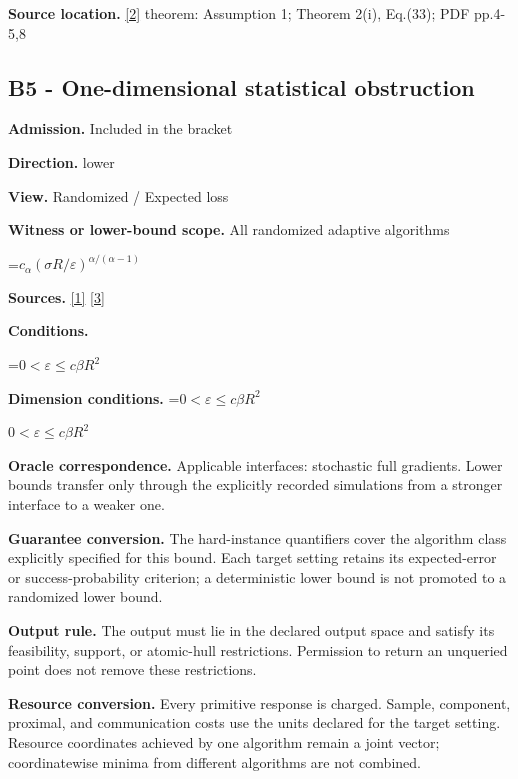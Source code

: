 \documentclass[10pt,a4paper]{article}
\newcommand{\AtlasMath}[1]{\par\begingroup\centering\setbox0=\hbox{$\displaystyle #1$}\ifdim\wd0>1.4\linewidth\typeout{ATLAS WIDE FORMULA: \the\wd0}\fi\ifdim\wd0>\linewidth\resizebox{\linewidth}{!}{\box0}\else\box0\fi\par\endgroup}
\newcommand{\AtlasInlineMath}[1]{\begingroup\setbox0=\hbox{$#1$}\ifdim\wd0>.4\linewidth\endgroup\AtlasMath{#1}\else\endgroup$#1$\fi}
\begin{document}
\textbf{Source location.} \href{https://arxiv.org/pdf/2510.11676}{[2]} theorem: Assumption 1; Theorem 2(i), Eq.(33); PDF pp.4-5,8



\subsection{B5 - One-dimensional statistical obstruction}


\textbf{Admission.} Included in the bracket



\textbf{Direction.} lower



\textbf{View.} Randomized / Expected loss



\textbf{Witness or lower-bound scope.} All randomized adaptive algorithms



\AtlasMath{c_\alpha (\sigma R/\varepsilon)^{\alpha/(\alpha-1)}}


\textbf{Sources.} \href{https://arxiv.org/pdf/2609.10874}{[1]} \href{https://proceedings.mlr.press/v202/sadiev23a/sadiev23a.pdf}{[3]}



\textbf{Conditions.}
\AtlasMath{0<\varepsilon\le c\beta R^2}




\textbf{Dimension conditions.} \AtlasInlineMath{0<\varepsilon\le c\beta R^2}



\textbf{Oracle correspondence.} Applicable interfaces: stochastic full gradients. Lower bounds transfer only through the explicitly recorded simulations from a stronger interface to a weaker one.



\textbf{Guarantee conversion.} The hard-instance quantifiers cover the algorithm class explicitly specified for this bound. Each target setting retains its expected-error or success-probability criterion; a deterministic lower bound is not promoted to a randomized lower bound.



\textbf{Output rule.} The output must lie in the declared output space and satisfy its feasibility, support, or atomic-hull restrictions. Permission to return an unqueried point does not remove these restrictions.



\textbf{Resource conversion.} Every primitive response is charged. Sample, component, proximal, and communication costs use the units declared for the target setting. Resource coordinates achieved by one algorithm remain a joint vector; coordinatewise minima from different algorithms are not combined.
\end{document}

